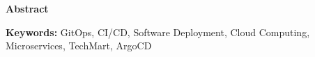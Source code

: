 \thispagestyle{empty}

\begin{center}
{\Large \textbf{Abstract}}
\end{center}

\vspace{1cm}



\textbf{Keywords:} GitOps, CI/CD, Software Deployment, Cloud Computing, Microservices, TechMart, ArgoCD

\newpage